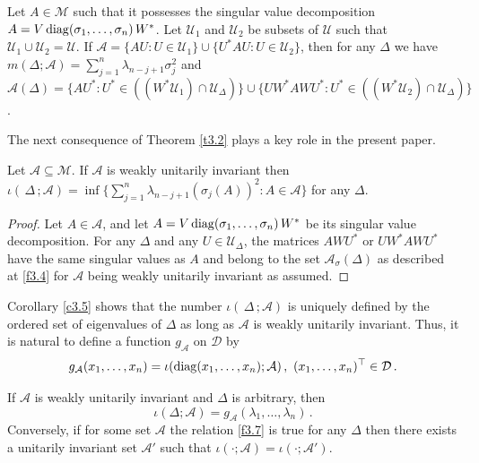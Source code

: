 \documentclass{amsart}
\begin{document}

\begin{cor} \label{c3.4}
   Let $A \in {\mathcal M}$ such that it possesses the singular value decomposition $A = V \, {\rm diag}(\sigma_1, \ldots , \sigma_n) \, W^*$. Let ${\mathcal U}_1$ and ${\mathcal U}_2$ be subsets of $\mathcal U$ such that ${\mathcal U}_1 \cup {\mathcal U}_2 = \mathcal U$. If ${\mathcal A}= \{ AU : U \in {\mathcal U}_1 \} \cup \{ U^*AU : U \in {\mathcal U}_2 \}$, then for any $\Delta$ we have $m(\Delta; {\mathcal A}) = \sum_{j=1}^n \lambda_{n-j+1} \sigma_j^2$ and ${\mathcal A}(\Delta) = \{ AU^*: U^* \in (( W^* {\mathcal U}_1) \cap {\mathcal U}_\Delta) \} \cup \{ UW^* A WU^* : U^* \in ((W^* {\mathcal U}_2) \cap {\mathcal U}_\Delta) \}$. 
\end{cor}

The next consequence of Theorem \ref{t3.2} plays a key role in the present paper. 

\begin{cor} \label{c3.5}
    Let ${\mathcal A} \subseteq {\mathcal M}$. If $\mathcal A$ is weakly unitarily invariant then $\iota(\,\Delta \,;{\mathcal A}) = \inf \{ \sum_{j=1}^n \lambda_{n-j+1} (\sigma_j(A))^2 : A \in {\mathcal A} \}$ for any $\Delta$.
\end{cor}   

\begin{proof}
Let $A \in {\mathcal A}$, and let $A= V \, {\rm diag}(\sigma_1, \ldots , \sigma_n) \, W^*$ be its singular value decomposition. For any $\Delta$ and any $U \in {\mathcal U}_\Delta$, the matrices $AWU^*$ or $UW^*AWU^*$ have the same singular values as $A$ and belong to the set ${\mathcal A}_\sigma(\Delta)$ as described at \eqref{f3.4} for $\mathcal A$ being weakly unitarily invariant as assumed.
\end{proof}

Corollary \ref{c3.5} shows that the number $\iota(\,\Delta \,;{\mathcal A})$ is uniquely defined by the ordered set of eigenvalues of $\Delta$ as long as ${\mathcal A}$ is weakly unitarily invariant. Thus, it is natural to define a function $g_{\mathcal A}$ on $\mathcal D$ by 
\[
   g_{\mathcal A}(x_1, \ldots , x_n) = \iota({\rm diag} (x_1, \ldots , x_n); {\mathcal A}) \, , \,\, (x_1, \ldots , x_n)^\top \in {\mathcal D} \, .
\]   

\begin{pro} \label{p3.6}
  If  $\mathcal A$ is weakly unitarily invariant and $\Delta$ is arbitrary, then
   \begin{equation} \label{f3.7}
       \iota(\Delta; {\mathcal A}) =  g_{\mathcal A}(\lambda_1, \ldots , \lambda_n) \, .
   \end{equation}
   Conversely, if for some set $\mathcal A$ the relation \eqref{f3.7} is true for any $\Delta$ then there exists a unitarily invariant set ${\mathcal A}'$ such that $\iota( \cdot ; {\mathcal A}) = \iota( \cdot ; {\mathcal A}')$. 
\end{pro}
\end{document}

